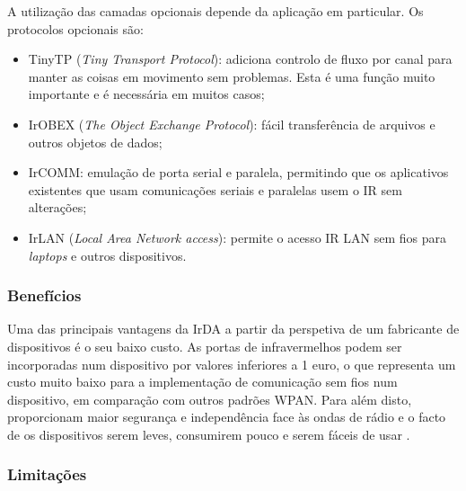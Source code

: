 \documentclass[conference]{IEEEtran}
\begin{document}
A utilização das camadas opcionais depende da aplicação em particular. Os protocolos opcionais são:

\begin{itemize}

 \item TinyTP (\textit{Tiny Transport Protocol}): adiciona controlo de fluxo por canal para manter as coisas em movimento sem problemas. Esta é uma função muito importante e é necessária em muitos casos;
 \item IrOBEX (\textit{The Object Exchange Protocol}): fácil transferência de arquivos e outros objetos de dados;
 \item IrCOMM: emulação de porta serial e paralela, permitindo que os aplicativos existentes que usam comunicações seriais e paralelas usem o IR sem alterações;
 \item IrLAN (\textit{Local Area Network access}): permite o acesso IR LAN sem fios para \textit{laptops} e outros dispositivos.

\end{itemize}



\subsubsection{Benefícios}

Uma das principais vantagens da IrDA a partir da perspetiva de um fabricante de dispositivos é o seu baixo custo. 
As portas de infravermelhos podem ser incorporadas num dispositivo por valores inferiores a 1 euro, o que representa um custo muito baixo para a implementação de comunicação sem fios num dispositivo, em comparação com outros padrões WPAN. 
Para além disto, proporcionam maior segurança e independência face às ondas de rádio e o facto de os dispositivos serem leves, consumirem pouco e serem fáceis de usar \cite{infaredadvdis}.


\subsubsection{Limitações}
\end{document}
